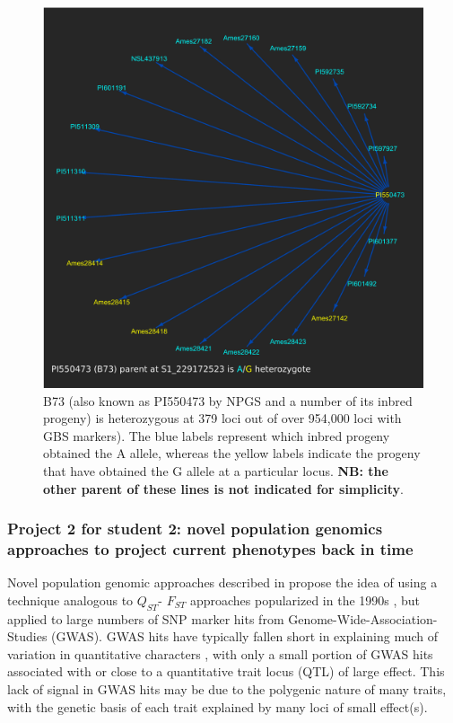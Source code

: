 \documentclass[draft,12pt]{article}
\begin{document}
\begin{figure}[p]
\includegraphics[width=1.0\linewidth]{Pruned.pdf}
\caption{B73 (also known as PI550473 by NPGS and a number of its inbred progeny) is heterozygous at 379 loci out of over 954,000 loci with GBS markers). The blue labels represent which inbred progeny obtained the A allele, whereas the yellow labels indicate the progeny that have obtained the G allele at a particular locus. \textbf{NB: the other parent of these lines is not indicated for simplicity}.}
\label{fig:alleledrop}
\end{figure}






\subsubsection*{Project 2 for student 2: novel population genomics approaches to project current phenotypes back in time}
Novel population genomic approaches described in \cite{Berg:2014bs} propose the idea of using a technique analogous to $Q_{ST}$- $F_{ST}$ approaches popularized in the 1990s \citep{Latta:1998ek,  McKay:2002wi}, but applied to large numbers of SNP marker hits from Genome-Wide-Association-Studies (GWAS). 
GWAS hits have typically fallen short in explaining much of variation in quantitative characters \citep{Rockman:2011ej}, with only a small portion of GWAS hits associated with or close to a quantitative trait locus (QTL) of large effect. 
This lack of signal in GWAS hits may be due to the polygenic nature of many traits, with the genetic basis of each trait explained by many loci of small effect(s). 
\end{document}
